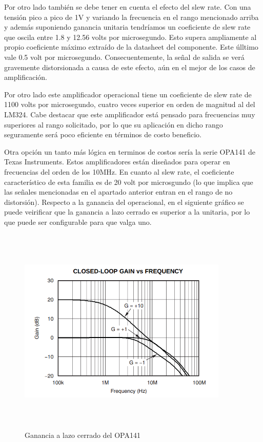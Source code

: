Por otro lado también se debe tener en cuenta el efecto del slew rate. Con una tensión pico a pico de 1V y variando la frecuencia en el rango mencionado arriba y además suponiendo ganancia unitaria tendríamos un coeficiente de slew rate que oscila entre 1.8 y 12.56 volts por microsegundo. Esto supera ampliamente al propio coeficiente máximo extraído de la datasheet del componente. Este úlltimo vale 0.5 volt por microsegundo. Consecuentemente, la se\~nal de salida se verá gravemente distorsionada a causa de este efecto, aún en el mejor de los casos de amplificación.

Por otro lado este amplificador operacional tiene un coeficiente de slew rate de 1100 volts por microsegundo, cuatro veces superior en orden de magnitud al del LM324. Cabe destacar que este amplificador está pensado para frecuencias muy superiores al rango solicitado, por lo que su aplicación en dicho rango seguramente será poco eficiente en términos de costo  beneficio.

Otra opción un tanto más lógica en terminos de costos sería la serie OPA141 de Texas Instruments. Estos amplificadores están dise\~nados para operar en frecuencias del orden de los 10MHz. En cuanto al slew rate, el coeficiente característico de esta familia es de 20 volt por microsgundo (lo que implica que las se\~nales mencionadas en el apartado anterior entran en el rango de no distorsión). Respecto a la ganancia  del operacional, en el siguiente gráfico se puede veirificar que la ganancia a lazo cerrado es superior a la unitaria, por lo que puede ser configurable para que valga uno.

\begin{figure}[H] %
	\centering
	\includegraphics[width=10cm,height=10cm,keepaspectratio]{../EJ1/00GRAFICOS/imagenes/EJ1_avcl_OPA141.png}
	\caption{Ganancia a lazo cerrado del OPA141}
	\label{i2}
\end{figure}

